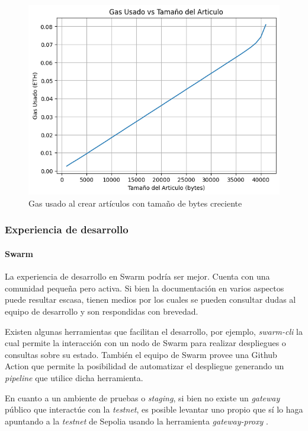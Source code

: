 \begin{figure}[H]
    \centering
    \includegraphics[width=0.75\linewidth]{img/aw-eth-bytes-articulo-incremental-gas.png}
    \caption{Gas usado al crear artículos con tamaño de bytes creciente}
    \label{fig:aw-eth-bytes-articulo-incremental-gas}
\end{figure}

\subsubsection{Experiencia de desarrollo} %

\paragraph{Swarm}
La experiencia de desarrollo en Swarm podría ser mejor. Cuenta con una comunidad pequeña pero activa. Si bien la documentación en varios aspectos puede resultar escasa, tienen medios por los cuales se pueden consultar dudas al equipo de desarrollo y son respondidas con brevedad.

Existen algunas herramientas que facilitan el desarrollo, por ejemplo, \textit{swarm-cli} \cite{swarm-cli} la cual permite la interacción con un nodo de Swarm para realizar despliegues o consultas sobre su estado. También el equipo de Swarm provee una Github Action que permite la posibilidad de automatizar el despliegue generando un \textit{pipeline} que utilice dicha herramienta.

En cuanto a un ambiente de pruebas o \textit{staging}, si bien no existe un \textit{gateway} público que interactúe con la \textit{testnet}, es posible levantar uno propio que sí lo haga apuntando a la \textit{testnet} de Sepolia usando la herramienta \textit{gateway-proxy} \cite{gateway-proxy}.

